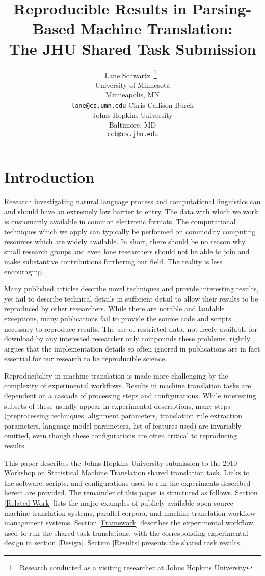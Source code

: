 \documentclass[11pt]{article}
\title{Reproducible Results in Parsing-Based Machine Translation:\\
The JHU Shared Task Submission}
\author{Lane Schwartz\
\thanks{\ Research conducted as a visiting researcher at Johns Hopkins University}\
\\University of Minnesota\\Minneapolis, MN\\
{\tt lane@cs.umn.edu} \And
Chris Callison-Burch \\
Johns Hopkins University \\
Baltimore, MD\\
{\tt ccb@cs.jhu.edu}}
\date{}
\begin{document}
\maketitle

\begin{abstract}
\end{abstract}


\section{Introduction}

Research investigating natural language process and computational linguistics can and should have an extremely low barrier to entry. The data with which we work is customarily available in common electronic formats. The computational techniques which we apply can typically be performed on commodity computing resources which are widely available. In short, there should be no reason why small research groups and even lone researchers should not be able to join and make substantive contributions furthering our field.
%
The reality is less encouraging. 

Many published articles describe novel techniques and provide interesting results, yet fail to describe technical details in sufficient detail to allow their results to be reproduced by other researchers. While there are notable and laudable exceptions, many publications fail to provide the source code and scripts necessary to reproduce results. The use of restricted data, not freely available for download by any interested researcher only compounds these problems.  rightly argues that the implementation details so often ignored in publications are in fact essential for our research to be reproducible science.

Reproducibility in machine translation is made more challenging by the complexity of experimental workflows. Results in machine translation tasks are dependent on a cascade of processing steps and configurations. While interesting subsets of these usually appear in experimental descriptions, many steps (preprocessing techniques, alignment parameters, translation rule extraction parameters, language model parameters, list of features used) are invariably omitted, even though these configurations are often critical to reproducing results.

This paper describes the Johns Hopkins University submission to the 2010 Workshop on Statistical Machine Translation shared translation task. Links to the software, scripts, and configurations used to run the experiments described herein are provided. The remainder of this paper is structured as follows. Section \ref{Related Work} lists the major examples of publicly available open source machine translation systems, parallel corpora, and machine translation workflow management systems. Section \ref{Framework} describes the experimental workflow used to run the shared task translations, with the corresponding experimental design in section \ref{Design}. Section \ref{Results} presents the shared task results.
\end{document}
